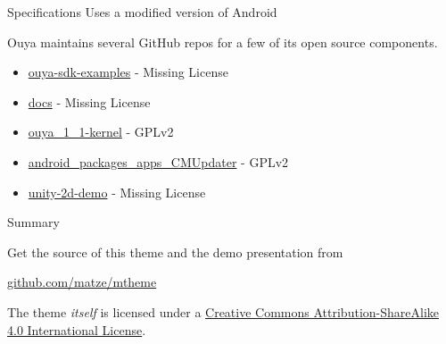 \documentclass[10pt, compress]{beamer}
\begin{document}
\begin{frame}{Specifications}
    Uses a modified version of Android
    
    \vspace{4mm}
    
    Ouya maintains several GitHub repos for a few of its open source components.

    \vspace{4mm}
    
    \begin{itemize}
    \item \href{https://github.com/ouya/ouya-sdk-examples}{\alert{ouya-sdk-examples}} - Missing License
    \item \href{https://github.com/ouya/docs}{\alert{docs}} - Missing License
    \item \href{https://github.com/ouya/ouya_1_1-kernel}{\alert{ouya\_1\_1-kernel}} - GPLv2
    \item \href{https://github.com/ouya/android_packages_apps_CMUpdater}{\alert{android\_packages\_apps\_CMUpdater}} - GPLv2
    \item \href{https://github.com/ouya/unity-2d-demo}{\alert{unity-2d-demo}} - Missing License
    \end{itemize}
\end{frame}

\begin{frame}{Summary}

  Get the source of this theme and the demo presentation from

  \begin{center}\url{github.com/matze/mtheme}\end{center}

  The theme \emph{itself} is licensed under a
  \href{http://creativecommons.org/licenses/by-sa/4.0/}{Creative Commons
  Attribution-ShareAlike 4.0 International License}.

  \begin{center}\ccbysa\end{center}

\end{frame}

\end{document}
